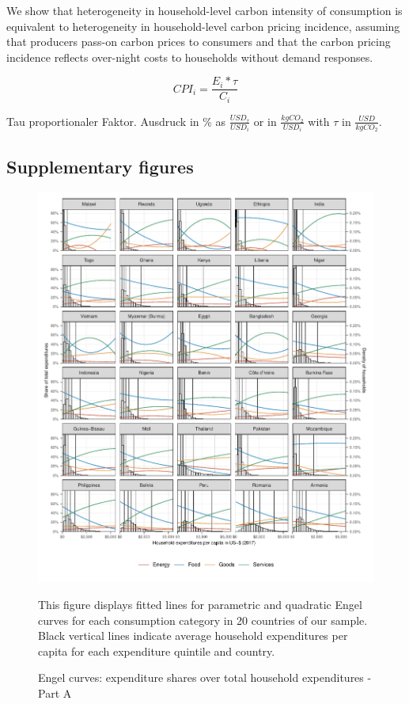 \documentclass[12pt, a4paper]{article}
\newenvironment{subcaption}
{\strut
\vspace{-5pt}
\begin{minipage}[b]{0.9\textwidth}
  \hspace*{-\parindent}
  \footnotesize}
 {\end{minipage}}
\begin{document}
We show that heterogeneity in household-level carbon intensity of consumption is equivalent to heterogeneity in household-level carbon pricing incidence, assuming that producers pass-on carbon prices to consumers and that the carbon pricing incidence reflects over-night costs to households without demand responses.

\begin{equation}
    CPI_{i} = \frac{E_{i}*\tau}{C_{i}}
\end{equation}

Tau proportionaler Faktor. Ausdruck in \% as $\frac{USD_{\tau}}{USD_{i}}$ or in $\frac{kgCO_{2}}{USD_{i}}$ with $\tau$ in $\frac{USD}{kgCO_{2}}$.

\clearpage

\renewcommand\thefigure{\thesection.\arabic{figure}}
\renewcommand\thetable{\thesection.\arabic{table}}
\setcounter{figure}{0}
\setcounter{table}{0}

\subsection{Supplementary figures} \label{sec:figures}

\begin{figure}[ht!]
  \centering
  \caption{Engel curves: expenditure shares over total household expenditures - Part A} \label{fig:A1}
  \includegraphics{Analysis_Parametric_Engel_Curves/Parametric_EC_0_A}
  \begin{subcaption}
    This figure displays fitted lines for parametric and quadratic Engel curves for each consumption category in 20 countries of our sample. Black vertical lines indicate average household expenditures per capita for each expenditure quintile and country.
  \end{subcaption}

\end{figure}
\end{document}
